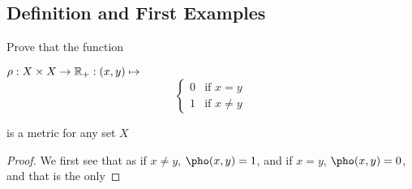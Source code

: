 \subsection{Definition and First Examples}

\begin{majorEx}
  Prove that the function
  \begin{center}
  $\rho : X \times X \rightarrow \mathbb{R}_+ : (x,y) \mapsto $
  \[ \begin{cases} 
    0 & \text{if } x=y \\
    1 & \text{if } x \neq y 
  \end{cases}
  \]
\end{center}
is a metric for any set $X$
\begin{proof}
   We first see that as if $x\neq y$, $\pho(x,y)= 1$, and if 
   $x = y$, $\pho(x,y)= 0$, and that is the only
\end{proof}  
  
\end{majorEx}
